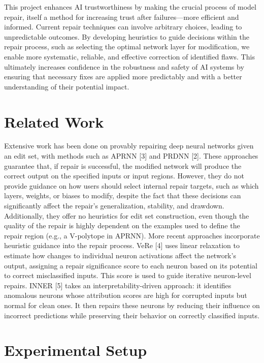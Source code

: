 \documentclass{article}
\begin{document}
This project enhances AI trustworthiness by making the crucial process of model repair, itself a method for increasing trust after failures—more efficient and informed.
Current repair techniques can involve arbitrary choices, leading to unpredictable outcomes.
By developing heuristics to guide decisions within the repair process, such as selecting the optimal network layer for modification, we enable more systematic, reliable, and effective correction of identified flaws.
This ultimately increases confidence in the robustness and safety of AI systems by ensuring that necessary fixes are applied more predictably and with a better understanding of their potential impact.

\section{Related Work}
Extensive work has been done on provably repairing deep neural networks given an edit set, with methods such as APRNN [3] and PRDNN [2].
These approaches guarantee that, if repair is successful, the modified network will produce the correct output on the specified inputs or input regions.
However, they do not provide guidance on how users should select internal repair targets, such as which layers, weights, or biases to modify, despite the fact that these decisions can significantly affect the repair’s generalization, stability, and drawdown.
Additionally, they offer no heuristics for edit set construction, even though the quality of the repair is highly dependent on the examples used to define the repair region (e.g., a V-polytope in APRNN).
More recent approaches incorporate heuristic guidance into the repair process.
VeRe [4] uses linear relaxation to estimate how changes to individual neuron activations affect the network's output, assigning a repair significance score to each neuron based on its potential to correct misclassified inputs.
This score is used to guide iterative neuron-level repairs. INNER [5] takes an interpretability-driven approach: it identifies anomalous neurons whose attribution scores are high for corrupted inputs but normal for clean ones.
It then repairs these neurons by reducing their influence on incorrect predictions while preserving their behavior on correctly classified inputs.


\section{Experimental Setup}
\end{document}
